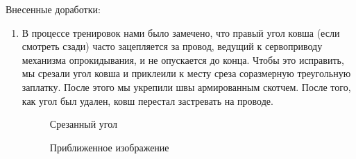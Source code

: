 Внесенные доработки:
\begin{enumerate}
	\item В процессе тренировок нами было замечено, что правый угол ковша (если смотреть сзади) часто зацепляется за провод, ведущий к сервоприводу механизма опрокидывания, и не опускается до конца. Чтобы это исправить, мы срезали угол ковша и приклеили к месту среза соразмерную треугольную заплатку. После этого мы укрепили швы армированным скотчем. После того, как угол был удален, ковш перестал застревать на проводе.
	\begin{figure}[H]
		\begin{minipage}[h]{0.47\linewidth}
			\caption{Срезанный угол}
		\end{minipage}
		\hfill
		\begin{minipage}[h]{0.47\linewidth}
			\caption{Приближенное изображение}
		\end{minipage}
	\end{figure}
	

\end{enumerate}
